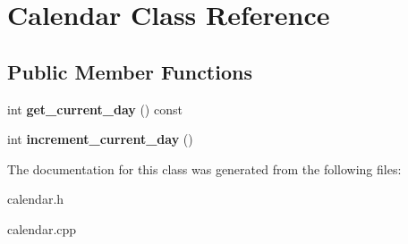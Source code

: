 \hypertarget{class_calendar}{}\section{Calendar Class Reference}
\label{class_calendar}
\subsection*{Public Member Functions}
\begin{DoxyCompactItemize}
\item 
\mbox{\label{class_calendar_af53e7c9f5a598c396504b0ef107db7b8}} 
int {\bfseries get\+\_\+current\+\_\+day} () const
\item 
\mbox{\label{class_calendar_a8956e5312eeeb102642b53b55d6fb128}} 
int {\bfseries increment\+\_\+current\+\_\+day} ()
\end{DoxyCompactItemize}


The documentation for this class was generated from the following files\+:\begin{DoxyCompactItemize}
\item 
calendar.\+h\item 
calendar.\+cpp\end{DoxyCompactItemize}
